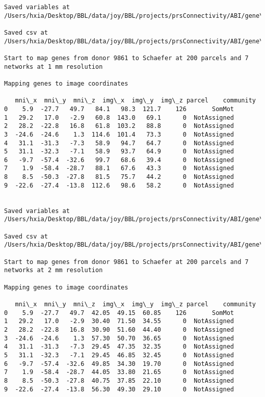 \documentclass[11pt]{article}
\begin{document}
\begin{Verbatim}[commandchars=\\\{\}]
Saved variables at /Users/hxia/Desktop/BBL/data/joy/BBL/projects/prsConnectivity/ABI/gene\_mapping/9861donor\_100Parcels\_17Network\_2mm.pkl

Saved csv at /Users/hxia/Desktop/BBL/data/joy/BBL/projects/prsConnectivity/ABI/gene\_mapping/9861donor\_100Parcels\_17Network\_2mm.csv

Start to map genes from donor 9861 to Schaefer at 200 parcels and 7 networks at 1 mm resolution

Mapping genes to image coordinates

   mni\_x  mni\_y  mni\_z  img\_x  img\_y  img\_z parcel    community
0    5.9  -27.7   49.7   84.1   98.3  121.7    126       SomMot
1   29.2   17.0   -2.9   60.8  143.0   69.1      0  NotAssigned
2   28.2  -22.8   16.8   61.8  103.2   88.8      0  NotAssigned
3  -24.6  -24.6    1.3  114.6  101.4   73.3      0  NotAssigned
4   31.1  -31.3   -7.3   58.9   94.7   64.7      0  NotAssigned
5   31.1  -32.3   -7.1   58.9   93.7   64.9      0  NotAssigned
6   -9.7  -57.4  -32.6   99.7   68.6   39.4      0  NotAssigned
7    1.9  -58.4  -28.7   88.1   67.6   43.3      0  NotAssigned
8    8.5  -50.3  -27.8   81.5   75.7   44.2      0  NotAssigned
9  -22.6  -27.4  -13.8  112.6   98.6   58.2      0  NotAssigned


Saved variables at /Users/hxia/Desktop/BBL/data/joy/BBL/projects/prsConnectivity/ABI/gene\_mapping/9861donor\_200Parcels\_7Network\_1mm.pkl

Saved csv at /Users/hxia/Desktop/BBL/data/joy/BBL/projects/prsConnectivity/ABI/gene\_mapping/9861donor\_200Parcels\_7Network\_1mm.csv

Start to map genes from donor 9861 to Schaefer at 200 parcels and 7 networks at 2 mm resolution

Mapping genes to image coordinates

   mni\_x  mni\_y  mni\_z  img\_x  img\_y  img\_z parcel    community
0    5.9  -27.7   49.7  42.05  49.15  60.85    126       SomMot
1   29.2   17.0   -2.9  30.40  71.50  34.55      0  NotAssigned
2   28.2  -22.8   16.8  30.90  51.60  44.40      0  NotAssigned
3  -24.6  -24.6    1.3  57.30  50.70  36.65      0  NotAssigned
4   31.1  -31.3   -7.3  29.45  47.35  32.35      0  NotAssigned
5   31.1  -32.3   -7.1  29.45  46.85  32.45      0  NotAssigned
6   -9.7  -57.4  -32.6  49.85  34.30  19.70      0  NotAssigned
7    1.9  -58.4  -28.7  44.05  33.80  21.65      0  NotAssigned
8    8.5  -50.3  -27.8  40.75  37.85  22.10      0  NotAssigned
9  -22.6  -27.4  -13.8  56.30  49.30  29.10      0  NotAssigned



\end{Verbatim}
\end{document}
